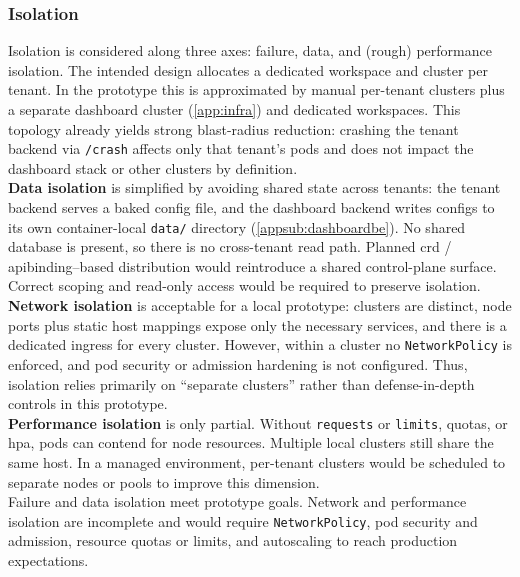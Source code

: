 \documentclass[11pt, a4paper, oneside, listof=totoc]{scrartcl}
\begin{document}
            \subsubsection{Isolation}\label{subsubsec:evalIsolation}
                Isolation is considered along three axes: failure, data, and (rough) performance
                isolation.
                The intended design allocates a dedicated workspace and cluster per tenant.
                In the prototype this is approximated by manual per-tenant clusters plus a separate
                dashboard cluster (\autoref{app:infra}) and dedicated workspaces.
                This topology already yields strong blast-radius reduction: crashing the tenant
                backend via \texttt{/crash} affects only that tenant’s pods and does not impact the
                dashboard stack or other clusters by definition.\\
                \textbf{Data isolation} is simplified by avoiding shared state across tenants: the
                tenant backend serves a baked config file, and the dashboard backend writes configs
                to its own container-local \texttt{data/} directory (\autoref{appsub:dashboardbe}).
                No shared database is present, so there is no cross-tenant read path.
                Planned \gls{crd} / \gls{apibinding}–based distribution would reintroduce a shared
                control-plane surface.
                Correct scoping and read-only access would be required to preserve isolation.\\
                \textbf{Network isolation} is acceptable for a local prototype: clusters are
                distinct, node ports plus static host mappings expose only the necessary services,
                and there is a dedicated \gls{ingress} for every cluster.
                However, within a cluster no \texttt{NetworkPolicy} is enforced, and pod security
                or admission hardening is not configured.
                Thus, isolation relies primarily on “separate clusters” rather than defense-in-depth
                controls in this prototype.\\
                \textbf{Performance isolation} is only partial.
                Without \texttt{requests} or \texttt{limits}, quotas, or \gls{hpa}, pods can contend
                for node resources.
                Multiple local clusters still share the same host.
                In a managed environment, per-tenant clusters would be scheduled to separate
                nodes or pools to improve this dimension.\\
                Failure and data isolation meet prototype goals.
                Network and performance isolation are incomplete and would require
                \texttt{NetworkPolicy}, pod security and admission, resource quotas or limits, and
                autoscaling to reach production expectations.
\end{document}
